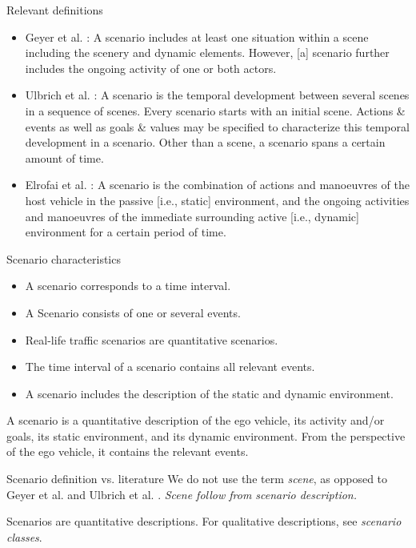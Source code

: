 \documentclass[aspectratio=\AspectR,10pt,compress,t]{beamer} %
\begin{document}
\begin{frame}{Relevant definitions}
	\begin{itemize}
		\item Geyer et al. \cite{geyer2014}: A scenario includes at least one situation within a scene including the scenery and dynamic elements. However, [a] scenario further includes the ongoing activity of one or both actors.
		\item Ulbrich et al. \cite{ulbrich2015}: A scenario is the temporal development between several scenes in a sequence of scenes. Every scenario starts with an initial scene. Actions \& events as well as goals \& values may be specified to characterize this temporal development in a scenario. Other than a scene, a scenario spans a certain amount of time.
		\item Elrofai et al. \cite{elrofai2016scenario}: A scenario is the combination of actions and manoeuvres of the host vehicle in the passive [i.e., static] environment, and the ongoing activities and manoeuvres of the immediate surrounding active [i.e., dynamic] environment for a certain period of time.
	\end{itemize}
\end{frame}

\begin{frame}{Scenario characteristics}
	\begin{itemize}
		\item A scenario corresponds to a time interval.
		\item A Scenario consists of one or several events.
		\item Real-life traffic scenarios are quantitative scenarios.
		\item The time interval of a scenario contains all relevant events.
		\item A scenario includes the description of the static and dynamic environment.
	\end{itemize}
	\begin{definition}[Scenario]
		A scenario is a quantitative description of the ego vehicle, its activity and/or goals, its static environment, and its dynamic environment. From the perspective of the ego vehicle, it contains the relevant events.
	\end{definition}
\end{frame}

\begin{frame}{Scenario definition vs. literature}
	We do not use the term \emph{scene}, as opposed to Geyer et al. \cite{geyer2014} and Ulbrich et al. \cite{ulbrich2015}. \emph{Scene follow from scenario description.}
	
	Scenarios are quantitative descriptions. For qualitative descriptions, see \emph{scenario classes}.
\end{frame}
\end{document}
